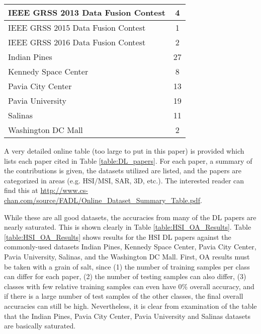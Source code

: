 \documentclass[12pt]{spieman}
\begin{document}
\begin{spacing}{1}
\begin{table}[ht]
\begin{center}
\begin{tabular}{|l|c|}
IEEE GRSS 2013 Data Fusion Contest \cite{IEEEGRSSDataFusion2013Dataset}     & 4   \\
\hline

IEEE GRSS 2015 Data Fusion Contest \cite{IEEEGRSSDataFusion2015Dataset}     & 1   \\
\hline

IEEE GRSS 2016 Data Fusion Contest \cite{IEEEGRSSDataFusion2016Dataset}     & 2   \\
\hline

Indian Pines \cite{IndianPinesDataset}	                                    & 27  \\
\hline

Kennedy Space Center \cite{KennedySpaceCenterDataSet}                       & 8   \\
\hline

Pavia City Center \cite{PaviaDatasets}                                      & 13  \\
\hline

Pavia University \cite{PaviaDatasets}                                       & 19  \\
\hline

Salinas \cite{SalinasDataset}                                               & 11  \\
\hline

Washington DC Mall \cite{WashingtonDCMallDataset}                            & 2   \\
\hline

\end{tabular}
\end{center}
\end{table}

A very detailed online table (too large to put in this paper) is provided which lists each paper cited in Table \ref{table:DL_papers}. For each paper, a summary of the contributions is given, the datasets utilized are listed, and the papers are categorized in areas (e.g. HSI/MSI, SAR, 3D, etc.). The interested reader can find this at \url{http://www.cs-chan.com/source/FADL/Online_Dataset_Summary_Table.pdf}.

While these are all good datasets, the accuracies from many of the DL papers are nearly saturated. This is shown clearly in Table \ref{table:HSI_OA_Results}. Table \ref{table:HSI_OA_Results} shows results for the HSI DL papers against the commonly-used datasets Indian Pines, Kennedy Space Center, Pavia City Center, Pavia University, Salinas, and the Washington DC Mall. First, OA results must be taken with a grain of salt, since (1) the number of training samples per class can differ for each paper, (2) the number of testing samples can also differ, (3) classes with few relative training samples can even have 0\% overall accuracy, and if there is a large number of test samples of the other classes, the final overall accuracies can still be high. Nevertheless, it is clear from examination of the table that the Indian Pines, Pavia City Center, Pavia University and Salinas datasets are basically saturated.


\end{spacing}
\end{document}
